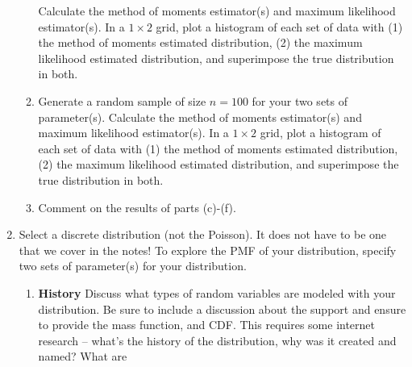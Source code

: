 \documentclass{article}\usepackage[]{graphicx}\usepackage[]{color}
\begin{document}
\begin{enumerate}
\begin{enumerate}
  Calculate the method of moments estimator(s) and maximum likelihood estimator(s).
  In a $1 \times 2$ grid, plot a histogram of each set of data with (1) the method 
  of moments estimated distribution, (2) the maximum likelihood estimated distribution,
  and superimpose the true distribution in both.
  \item Generate a random sample of size $n=100$ for your two sets of parameter(s). 
  Calculate the method of moments estimator(s) and maximum likelihood estimator(s). 
  In a $1 \times 2$ grid, plot a histogram of each set of data with (1) the method 
  of moments estimated distribution, (2) the maximum likelihood estimated distribution, 
  and superimpose the true distribution in both.
  \item Comment on the results of parts (c)-(f). 
\end{enumerate}
\newpage
  \item\label{Q3} Select a discrete distribution (not the Poisson). It does not 
  have to be one that we cover in the notes! To explore the PMF of your distribution, 
  specify two sets of parameter(s) for your distribution.
  \begin{enumerate}
  \item \textbf{History} Discuss what types of random variables are modeled with 
  your distribution. Be sure to include a discussion about the support and ensure
  to provide the mass function, and CDF. This requires some internet research -- 
  what's the history of the distribution, why was it created and named? What are

\end{enumerate}
\end{enumerate}
\end{document}
